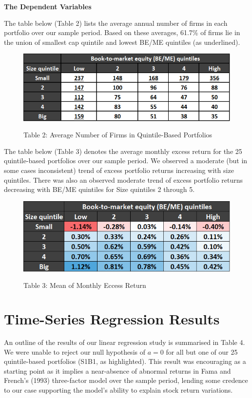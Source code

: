 \documentclass[12pt]{article}
\begin{document}
\noindent \textbf{The Dependent Variables}   

\noindent The table below (Table 2) lists the average annual number of firms in each portfolio over our sample period. Based on these averages, 61.7\% of firms lie in the union of smallest cap quintile and lowest BE/ME quintiles (as underlined).

\begin{figure}[h]
	\centering
	\caption*{Table 2: Average Number of Firms in Quintile-Based Portfolios}
	\includegraphics[width=0.5\linewidth]{A3.png}
	\label{fig:label}
\end{figure}

\noindent The table below (Table 3) denotes the average monthly excess return for the 25 quintile-based portfolios over our sample period. We observed a moderate (but in some cases inconsistent) trend of excess portfolio returns increasing with size quintiles. There was also an observed moderate trend of excess portfolio returns decreasing with BE/ME quintiles for Size quintiles 2 through 5.

\begin{figure}[h]
	\centering
	\caption*{Table 3: Mean of Monthly Eccess Return}
	\includegraphics[width=0.48\linewidth]{A4.png}
	\label{fig:label}
\end{figure}

\section{Time-Series Regression Results}

\noindent An outline of the results of our linear regression study is summarised in Table 4. We were unable to reject our null hypothesis of $a=0$ for all but one of our 25 quintile-based portfolios (S1B1, as highlighted). This result was encouraging as a starting point as it implies a near-absence of abnormal returns in Fama and French's (1993) three-factor model over the sample period, lending some credence to our case supporting the model's ability to explain stock return variations. 
\end{document}

